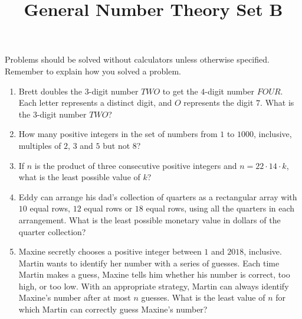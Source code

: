\documentclass{article}
\title{General Number Theory Set B}
\date{}
\author{}
\begin{document}
\maketitle
\noindent Problems should be solved without calculators unless otherwise specified.
Remember to explain how you solved a problem.
\begin{multicols}{2}
    \begin{enumerate}
        \item Brett doubles the $3$-digit number $TWO$ to get the $4$-digit number $FOUR$.
            Each letter represents a distinct digit, and $O$ represents the digit $7$.
            What is the $3$-digit number $TWO$?
            \vspace{3cm}
        \item How many positive integers in the set of numbers from $1$ to $1000$, inclusive, multiples of $2$, $3$ and $5$ but not $8$?
            \vspace{3cm}
        \item If $n$ is the product of three consecutive positive integers and $n = 22 \cdot 14 \cdot k$, what is the least possible value of $k$?
            \vspace{3cm}
        \item Eddy can arrange his dad's collection of quarters as a rectangular array with $10$ equal rows, $12$ equal rows or $18$ equal rows, using all the quarters in each arrangement.
            What is the least possible monetary value in dollars of the quarter collection?
            \vspace{3cm}
        \item Maxine secretly chooses a positive integer between $1$ and $2018$, inclusive.
            Martin wants to identify her number with a series of guesses.
            Each time Martin makes a guess, Maxine tells him whether his number is correct, too high, or too low.
            With an appropriate strategy, Martin can always identify Maxine's number after at most $n$ guesses.
            What is the least value of $n$ for which Martin can correctly guess Maxine's number?
            \vspace{3cm}
    \end{enumerate}
\end{multicols}
\end{document}
